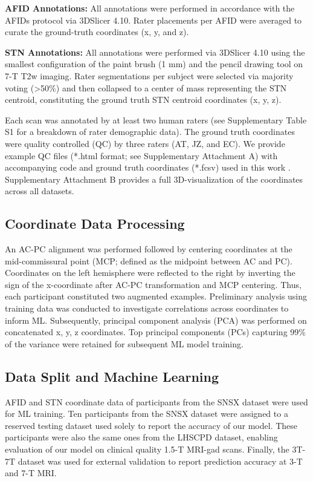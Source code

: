 \textbf{AFID Annotations:} All annotations were performed in accordance with the AFIDs protocol via 3DSlicer 4.10. Rater placements per AFID were averaged to curate the ground-truth coordinates (x, y, and z).

\textbf{STN Annotations:} All annotations were performed via 3DSlicer 4.10 \cite{ref} using the smallest configuration of the paint brush (1 mm) and the pencil drawing tool on 7-T T2w imaging. Rater segmentations per subject were selected via majority voting (>50\%) and then collapsed to a center of mass representing the STN centroid, constituting the ground truth STN centroid coordinates (x, y, z).

Each scan was annotated by at least two human raters (see Supplementary Table S1 for a breakdown of rater demographic data). The ground truth coordinates were quality controlled (QC) by three raters (AT, JZ, and EC). We provide example QC files (*.html format; see Supplementary Attachment A) with accompanying code and ground truth coordinates (*.fcsv) used in this work \cite{ref}. Supplementary Attachment B provides a full 3D-visualization of the coordinates across all datasets.

\subsection{Coordinate Data Processing}
An AC-PC alignment was performed followed by centering coordinates at the mid-commissural point (MCP; defined as the midpoint between AC and PC). Coordinates on the left hemisphere were reflected to the right by inverting the sign of the x-coordinate after AC-PC transformation and MCP centering. Thus, each participant constituted two augmented examples. Preliminary analysis using training data was conducted to investigate correlations across coordinates to inform ML. Subsequently, principal component analysis (PCA) was performed on concatenated x, y, z coordinates. Top principal components (PCs) capturing 99\% of the variance were retained for subsequent ML model training.

\subsection{Data Split and Machine Learning}
AFID and STN coordinate data of participants from the SNSX dataset were used for ML training. Ten participants from the SNSX dataset were assigned to a reserved testing dataset used solely to report the accuracy of our model. These participants were also the same ones from the LHSCPD dataset, enabling evaluation of our model on clinical quality 1.5-T MRI-gad scans. Finally, the 3T-7T dataset was used for external validation to report prediction accuracy at 3-T and 7-T MRI.

